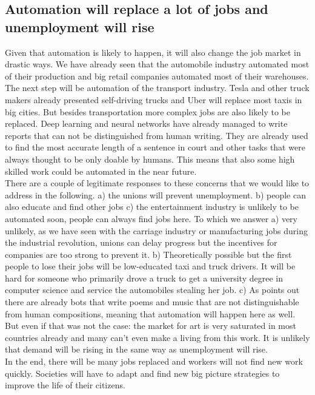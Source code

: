 \documentclass[conference]{IEEEtran}
\begin{document}
\subsection{Automation will replace a lot of jobs and unemployment will rise}

Given that automation is likely to happen, it will also change the job market in drastic ways. We have already seen that the automobile industry automated most of their production and big retail companies automated most of their warehouses. The next step will be automation of the transport industry. Tesla and other truck makers already presented self-driving trucks and Uber will replace most taxis in big cities. But besides transportation more complex jobs are also likely to be replaced. Deep learning and neural networks have already managed to write reports that can not be distinguished from human writing. They are already used to find the most accurate length of a sentence in court and other tasks that were always thought to be only doable by humans. This means that also some high skilled work could be automated in the near future.\\
There are a couple of legitimate responses to these concerns that we would like to address in the following. a) the unions will prevent unemployment. b) people can also educate and find other jobs c) the entertainment industry is unlikely to be automated soon, people can always find jobs here. To which we answer a) very unlikely, as we have seen with the carriage industry or manufacturing jobs during the industrial revolution, unions can delay progress but the incentives for companies are too strong to prevent it. b) Theoretically possible but the first people to lose their jobs will be low-educated taxi and truck drivers. It will be hard for someone who primarily drove a truck to get a university degree in computer science and service the automobiles stealing her job. c) As \cite{AutomationCPGgrey} points out there are already bots that write poems and music that are not distinguishable from human compositions, meaning that automation will happen here as well. But even if that was not the case: the market for art is very saturated in most countries already and many can't even make a living from this work. It is unlikely that demand will be rising in the same way as unemployment will rise. \\
In the end, there will be many jobs replaced and workers will not find new work quickly. Societies will have to adapt and find new big picture strategies to improve the life of their citizens.
\end{document}
